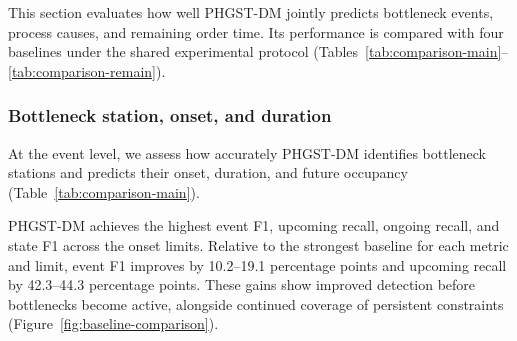 \documentclass[a4paper,fleqn]{cas-dc}
\begin{document}
This section evaluates how well PHGST-DM jointly predicts bottleneck events, process causes, and remaining order time. Its performance is compared with four baselines under the shared experimental protocol (Tables~\ref{tab:comparison-main}--\ref{tab:comparison-remain}).

\subsubsection{Bottleneck station, onset, and duration}\label{sec:comparison-event}

At the event level, we assess how accurately PHGST-DM identifies bottleneck stations and predicts their onset, duration, and future occupancy (Table~\ref{tab:comparison-main}).

PHGST-DM achieves the highest event F1, upcoming recall, ongoing recall, and state F1 across the onset limits. Relative to the strongest baseline for each metric and limit, event F1 improves by 10.2--19.1 percentage points and upcoming recall by 42.3--44.3 percentage points. These gains show improved detection before bottlenecks become active, alongside continued coverage of persistent constraints (Figure~\ref{fig:baseline-comparison}).
\end{document}
